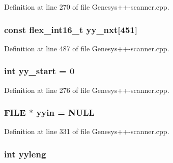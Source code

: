 Definition at line 270 of file Genesys++-\/scanner.\-cpp.

\hypertarget{_genesys_09_09-scanner_8cpp_a9f6d66f8c7d0f1927b1ab1ffe1b213ca}{
\subsubsection[{yy\-\_\-nxt}]{\setlength{\rightskip}{0pt plus 5cm}const {\bf flex\-\_\-int16\-\_\-t} yy\-\_\-nxt\mbox{[}451\mbox{]}\hspace{0.3cm}{\ttfamily [static]}}}\label{_genesys_09_09-scanner_8cpp_a9f6d66f8c7d0f1927b1ab1ffe1b213ca}


Definition at line 487 of file Genesys++-\/scanner.\-cpp.

\hypertarget{_genesys_09_09-scanner_8cpp_a2e1e1d9ee4610a6679d49ed8194b00af}{
\subsubsection[{yy\-\_\-start}]{\setlength{\rightskip}{0pt plus 5cm}int yy\-\_\-start = 0\hspace{0.3cm}{\ttfamily [static]}}}\label{_genesys_09_09-scanner_8cpp_a2e1e1d9ee4610a6679d49ed8194b00af}


Definition at line 276 of file Genesys++-\/scanner.\-cpp.

\hypertarget{_genesys_09_09-scanner_8cpp_a87a127afa8f6c307fbfba10390675406}{
\subsubsection[{yyin}]{\setlength{\rightskip}{0pt plus 5cm}F\-I\-L\-E $\ast$ yyin = N\-U\-L\-L}}\label{_genesys_09_09-scanner_8cpp_a87a127afa8f6c307fbfba10390675406}


Definition at line 331 of file Genesys++-\/scanner.\-cpp.

\hypertarget{_genesys_09_09-scanner_8cpp_a1b5865350b5ca5c1d69f429c2a652953}{
\subsubsection[{yyleng}]{\setlength{\rightskip}{0pt plus 5cm}int yyleng}}\label{_genesys_09_09-scanner_8cpp_a1b5865350b5ca5c1d69f429c2a652953}


